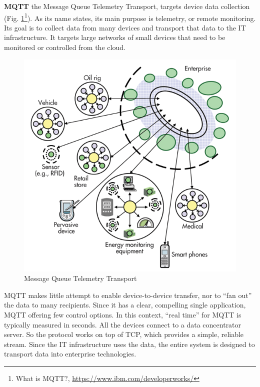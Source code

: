       \textbf{MQTT}
      \newline
      the Message Queue Telemetry Transport, targets device data collection (Fig. \ref{img:MQTT}\footnote{What is MQTT?, \url{https://www.ibm.com/developerworks/}}). As its name states, its main purpose is telemetry, or remote monitoring. Its goal is to collect data from many devices and transport that data to the IT infrastructure. It targets large networks of small devices that need to be monitored or controlled from the cloud.
      \begin{figure}[!ht]
      \centering
      \includegraphics[scale=0.6]{images/MQTT.png}   
      \caption[Message Queue Telemetry Transport]{Message Queue Telemetry Transport}
      \label{img:MQTT}                           
      \end{figure}
      MQTT makes little attempt to enable device-to-device transfer, nor to ``fan out'' the data to many recipients. Since it has a clear, compelling single application, MQTT offering few control options. In this context, ``real time'' for MQTT is typically measured in seconds. All the devices connect to a data concentrator server. So the protocol works on top of TCP, which provides a simple, reliable stream. Since the IT infrastructure uses the data, the entire system is designed to transport data into enterprise technologies.

